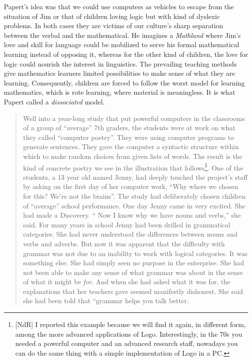 Papert's idea was that we could use computers as vehicles to escape from the situation of Jim or that of children loving logic but with kind of dyslexic problems. In both cases they are victims of our culture's sharp separation between the verbal and the mathematical. He imagines a \textit{Mathland} where Jim's love and skill for language could be mobilized to serve his formal mathematical learning instead of opposing it, whereas for the other kind of children, the love for logic could nourish the interest in linguistics. The prevailing teaching methods give mathematics learners limited possibilities to make sense of what they are learning. Consequently, children are forced to follow the worst model for learning mathematics, which is rote learning, where material is meaningless. It is what Papert called a \textit{dissociated} model.

\begin{quote}
Well into a year-long study that put powerful computers in the classrooms of a group of “average” 7th graders, the students were at work on what they called “computer poetry”.  They were using computer programs to generate sentences. They gave the computer a syntactic structure within which to make random choices from given lists of words. The result is the kind of concrete poetry we see in the illustration that follows\footnote{[NdR] I reported this example because we will find it again, in different form, among the more advanced applications of Logo. Interestingly, in the 70s you needed a powerful computer and an advanced research staff, nowadays you can do the same thing with a simple implementation of Logo in a PC.}. One of the students, a 13 year old named Jenny, had deeply touched the project’s staff by asking on the first day of her computer work, “Why where we chosen for this? We’re not the brains”. The study had deliberately chosen children of “average” school performance. One day Jenny came in very excited. She had made a Discovery. “ Now I know why we have nouns and verbs,” she said.  For many years in school Jenny had been drilled in grammatical categories. She had never understood the differences between nouns and verbs and adverbs.  But now it was apparent that the difficulty with grammar was not due to an inability to work with logical categories. It was something else. She had simply seen no purpose in the enterprise. She had not been able to make any sense of what grammar was about in the sense of what it might be \textit{for}. And when she had asked what it was for, the explanations that her teachers gave seemed manifestly dishonest. She said she had been told that “grammar helps you talk better.
\end{quote}

